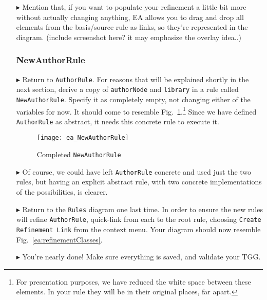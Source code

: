 \begin{itemize}
\item[$\blacktriangleright$] Mention that, if you want to populate your refinement a little bit more without actually changing anything, EA allows you to drag
and drop all elements from the basis/source rule as links, so they're represented in the diagram. (include screenshot here? it may emphasize the overlay idea..)

\subsubsection{NewAuthorRule} %

\item[$\blacktriangleright$] Return to \texttt{AuthorRule}. For reasons that will be explained shortly in the next section, derive a copy of \texttt{authorNode}
and \texttt{library} in a rule called \texttt{NewAuthorRule}. Specify it as completely empty, not changing either of the variables for now. It should come to
resemble Fig.~\ref{ea:NewAuthorRule}.\footnote{For presentation purposes, we have reduced the white space between these elements. In your rule they
will be in their original places, far apart.} Since we have defined \texttt{AuthorRule} as abstract, it needs this concrete rule to execute it. 

\vspace{0.5cm}

\begin{figure}[htbp]
\begin{center}
  \texttt{[image: ea\_NewAuthorRule]}
  \caption{Completed \texttt{NewAuthorRule}}
  \label{ea:NewAuthorRule}
\end{center}
\end{figure}

\item[$\blacktriangleright$] Of course, we could have left \texttt{AuthorRule} concrete and used just the two rules, but having an explicit abstract rule, with
two concrete implementations of the possibilities, is clearer.

\item[$\blacktriangleright$] Return to the \texttt{Rules} diagram one last time. In order to ensure the new rules will refine \texttt{AuthorRule},
quick-link from each to the root rule, choosing \texttt{Create Refinement Link} from the context menu. Your diagram should now resemble
Fig.~\ref{ea:refinementClasses}.

\item[$\blacktriangleright$] You're nearly done! Make sure everything is saved, and validate your TGG. 


\end{itemize}

